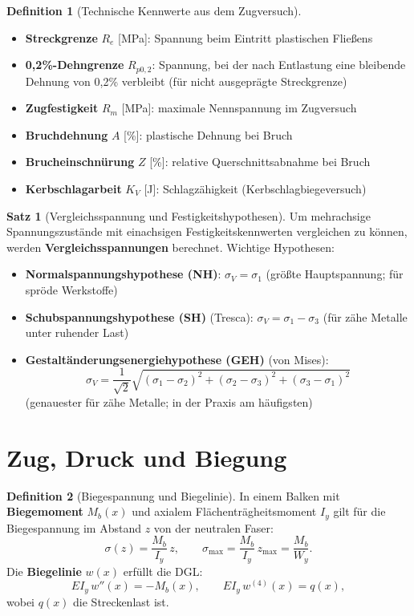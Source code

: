 ﻿\documentclass[a4paper,12pt]{report}
\theoremstyle{definition}
\newtheorem{definition}{Definition}
\newtheorem{satz}{Satz}
\begin{document}
\begin{definition}[Technische Kennwerte aus dem Zugversuch]
\begin{itemize}
    \item[-] \textbf{Streckgrenze} $R_e$ [MPa]: Spannung beim Eintritt plastischen Flie\ss{}ens
    \item[-] \textbf{0{,}2\%-Dehngrenze} $R_{p0,2}$: Spannung, bei der nach Entlastung
          eine bleibende Dehnung von 0{,}2\% verbleibt (f\"ur nicht ausgeprägte Streckgrenze)
    \item[-] \textbf{Zugfestigkeit} $R_m$ [MPa]: maximale Nennspannung im Zugversuch
    \item[-] \textbf{Bruchdehnung} $A$ [\%]: plastische Dehnung bei Bruch
    \item[-] \textbf{Brucheinschn\"urung} $Z$ [\%]: relative Querschnittsabnahme bei Bruch
    \item[-] \textbf{Kerbschlagarbeit} $K_V$ [J]: Schlagz\"ahigkeit (Kerbschlagbiegeversuch)
\end{itemize}
\end{definition}

\begin{satz}[Vergleichsspannung und Festigkeitshypothesen]
Um mehrachsige Spannungszust\"ande mit einachsigen Festigkeitskennwerten
vergleichen zu k\"onnen, werden \textbf{Vergleichsspannungen} berechnet.
Wichtige Hypothesen:
\begin{itemize}
    \item[-] \textbf{Normalspannungshypothese (NH)}: $\sigma_V = \sigma_1$
          (gr\"o\ss{}te Hauptspannung; f\"ur spr\"ode Werkstoffe)
    \item[-] \textbf{Schubspannungshypothese (SH)} (Tresca):
          $\sigma_V = \sigma_1 - \sigma_3$ (f\"ur z\"ahe Metalle unter ruhender Last)
    \item[-] \textbf{Gestalt\"anderungsenergiehypothese (GEH)} (von Mises):
          \[
            \sigma_V = \frac{1}{\sqrt{2}}\sqrt{(\sigma_1-\sigma_2)^2+(\sigma_2-\sigma_3)^2+(\sigma_3-\sigma_1)^2}
          \]
          (genauester f\"ur z\"ahe Metalle; in der Praxis am h\"aufigsten)
\end{itemize}
\end{satz}

\section{Zug, Druck und Biegung}

\begin{definition}[Biegespannung und Biegelinie]
In einem Balken mit \textbf{Biegemoment} $M_b(x)$ und axialem
Fl\"achentr\"agheitsmoment $I_y$ gilt f\"ur die Biegespannung im Abstand $z$
von der neutralen Faser:
\[
  \sigma(z) = \frac{M_b}{I_y}\,z, \qquad
  \sigma_{\max} = \frac{M_b}{I_y}\,z_{\max} = \frac{M_b}{W_y}.
\]
Die \textbf{Biegelinie} $w(x)$ erf\"ullt die DGL:
\[
  EI_y\,w''(x) = -M_b(x), \qquad EI_y\,w^{(4)}(x) = q(x),
\]
wobei $q(x)$ die Streckenlast ist.
\end{definition}
\end{document}
